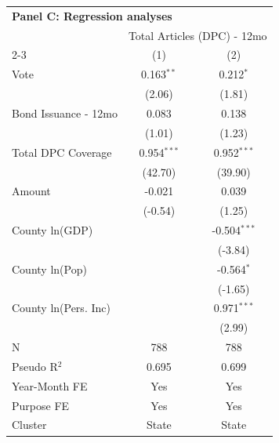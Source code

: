 \begingroup
\centering
\begin{tabular*}{\textwidth}{@{\extracolsep{\fill}}lcc}
\multicolumn{3}{l}{\textbf{Panel C: Regression analyses}}\\

\addlinespace
   \toprule
    & \multicolumn{2}{c}{Total Articles (DPC) - 12mo}\\
   \cmidrule(lr){2-3}
                        & (1)           & (2)\\  
   \midrule 
   Vote                 & 0.163$^{**}$  & 0.212$^{*}$\\   
                        & (2.06)        & (1.81)\\   
   Bond Issuance - 12mo & 0.083         & 0.138\\   
                        & (1.01)        & (1.23)\\   
   Total DPC Coverage   & 0.954$^{***}$ & 0.952$^{***}$\\   
                        & (42.70)        & (39.90)\\   
   Amount               & -0.021        & 0.039\\   
                        & (-0.54)      & (1.25)\\   
   County ln(GDP)       &               & -0.504$^{***}$\\   
                        &               & (-3.84)\\   
   County ln(Pop)       &               & -0.564$^{*}$\\   
                        &               & (-1.65)\\   
   County ln(Pers. Inc) &               & 0.971$^{***}$\\   
                        &               & (2.99)\\   
   \hline
   N         & 788           & 788\\  
   Pseudo R$^2$         & 0.695         & 0.699\\  
   Year-Month FE        & Yes           & Yes\\  
   Purpose FE           & Yes           & Yes\\  
   Cluster              & State & State\\  
   \bottomrule
\end{tabular*}
\par\endgroup
